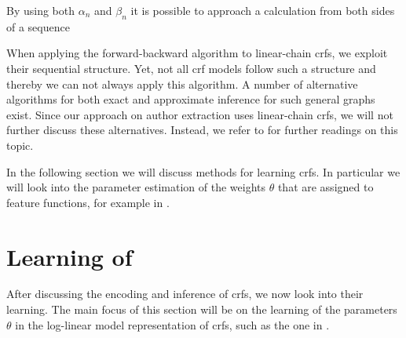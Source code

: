 \bigskip

By using both $\alpha_n$ and $\beta_n$ it is possible to approach a calculation from both sides of a sequence


\bigskip

When applying the forward-backward algorithm to \glspl{linear-chain crf}, we exploit their sequential structure.
Yet, not all \gls{crf} models follow such a structure and thereby we can not always apply this algorithm.
A number of alternative algorithms for both exact and approximate inference for such general graphs exist.
Since our approach on author extraction uses \glspl{linear-chain crf}, we will not further discuss these alternatives.
Instead, we refer to \citet{koller2009probabilistic} for further readings on this topic.

\bigskip

In the following section we will discuss methods for learning \glspl{crf}.
In particular we will look into the parameter estimation of the weights $\theta$ that are assigned to \glspl{feature function}, for example in .

\section{Learning of }\label{sec:learning-crfs}

After discussing the encoding and inference of \glspl{crf}, we now look into their learning.
The main focus of this section will be on the learning of the parameters $\theta$ in the \gls{log-linear model} representation of \glspl{crf}, such as the one in .

\bigskip

